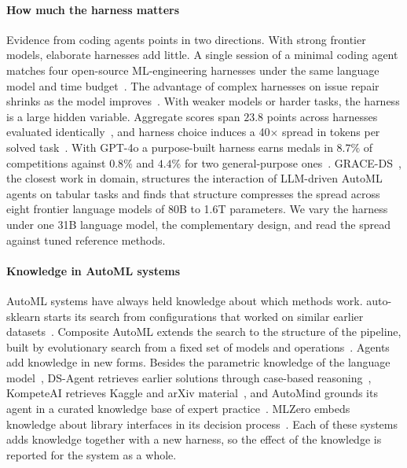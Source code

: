 \paragraph{How much the harness matters} Evidence from coding agents points
in two directions. With strong frontier models, elaborate harnesses add
little. A single session of a minimal coding agent matches four open-source
ML-engineering harnesses under the same language model and time
budget~\citep{brilliantov2026harness}. The advantage of complex harnesses
on issue repair shrinks as the model
improves~\citep{hu2026beyondmodel,kapoor2024agents}. With weaker models or
harder tasks, the harness is a large hidden variable. Aggregate scores span
$23.8$ points across harnesses evaluated
identically~\citep{harnessbench2026}, and harness choice induces a
40$\times$ spread in tokens per solved task~\citep{scaffoldeffect2026}. With
GPT-4o a purpose-built harness
earns medals in $8.7\%$ of competitions against $0.8\%$ and $4.4\%$ for two
general-purpose ones~\citep{chan2025mlebench}. GRACE-DS~\citep{tsymbalov2026graceds}, the
closest work in domain, structures the interaction of LLM-driven AutoML
agents on tabular tasks and finds that structure compresses the spread across
eight frontier language models of 80B to 1.6T parameters. We vary the harness under
one 31B language model, the complementary design, and read the spread against
tuned reference methods.

\paragraph{Knowledge in AutoML systems} AutoML systems have always held
knowledge about which methods work. auto-sklearn starts its search from
configurations that worked on similar earlier
datasets~\citep{feurer2015autosklearn}. Composite AutoML extends the search
to the structure of the pipeline, built by evolutionary search from a fixed
set of models and
operations~\citep{nikitin2022fedot,revin2023timeseries,nikitin2024sensitivity}.
Agents add knowledge in new forms. Besides the parametric knowledge of the
language model~\citep{xu2024conflicts}, DS-Agent retrieves earlier solutions through case-based
reasoning~\citep{guo2024dsagent}, KompeteAI retrieves Kaggle and arXiv
material~\citep{kulibaba2025kompeteai}, and AutoMind grounds its agent in a
curated knowledge base of expert practice~\citep{luo2025automind}. MLZero
embeds knowledge about library interfaces in its decision
process~\citep{fang2025mlzero}. Each of these systems adds knowledge
together with a new harness, so the effect of the knowledge is reported for
the system as a whole.

